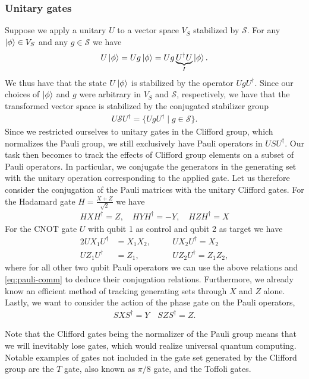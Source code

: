 \subsubsection{Unitary gates}
Suppose we apply a unitary $U$ to a vector space $V_S$ stabilized by
$\mathcal{S}$. For any $\ket{\phi} \in V_S$ and any $g \in \mathcal{S}$ we have
\begin{align}
  U\ket{\phi} = U g \ket{\phi} = U g \underbrace{U^\dagger U}_{I} \ket{\phi}
.\end{align}
We thus have that the state $U\ket{\phi}$ is stabilized by the operator
$UgU^\dagger$. Since our choices of $\ket{\phi}$ and $g$ were arbitrary in
$V_S$ and $\mathcal{S}$, respectively, we have that the transformed vector
space is stabilized by the conjugated stabilizer group
\begin{align}
  U\mathcal{S}U^\dagger = \{ UgU^\dagger \mid g \in \mathcal{S}\}
.\end{align}
Since we restricted ourselves to unitary gates in the Clifford group, which
normalizes the Pauli group, we still exclusively have Pauli operators in
$USU^\dagger$. Our task then becomes to track the effects of Clifford group
elements on a subset of Pauli operators. In particular, we conjugate the
generators in the generating set with the unitary operation corresponding to
the applied gate. Let us therefore consider the
conjugation of the Pauli matrices with the unitary Clifford gates.
For the Hadamard gate $H = \frac{X+Z}{\sqrt{2}}$ we have
\begin{align}
  HXH^\dagger = Z, \quad HYH^\dagger = -Y, \quad HZH^\dagger = X
\end{align}
For the CNOT gate $U$ with qubit 1 as control and qubit 2 as target we have
\begin{alignat}{2}
  UX_1U^\dagger &= X_1X_2, \quad &&UX_2U^\dagger = X_2 \label{eq:cnot-x}\\
  UZ_1U^\dagger &= Z_1, \quad &&UZ_2U^\dagger = Z_1Z_2
,\end{alignat}
where for all other two qubit Pauli operators we can use the above relations
and \cref{eq:pauli-comm} to
deduce their conjugation relations. Furthermore, we already know an efficient method
of tracking generating sets through $X$ and $Z$ alone.
Lastly, we want to consider the action of the phase gate on the Pauli
operators,
\begin{align}
  SXS^\dagger = Y \quad SZS^\dagger = Z
.\end{align}

Note that the Clifford gates being the normalizer of the Pauli group means that
we will inevitably lose gates, which would realize universal quantum computing.
Notable examples of gates not included in the gate set generated by the
Clifford group are the $T$ gate, also known as $\pi /8$ gate, and the Toffoli
gates.

